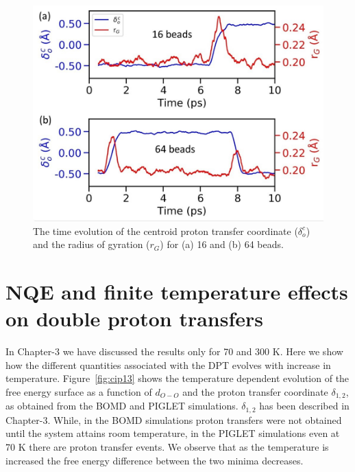 \begin{figure}
    \centering
    \includegraphics[width=15cm ]{./Appendix4/new_figures_si/figure10.jpg}
    \caption{The time evolution of the centroid proton transfer coordinate ($\delta_{o}^{c}$) and the radius of gyration ($r_G$) for (a) 16 and (b) 64 beads.}
    \label{fig:cip10}
\end{figure}

\section{NQE and finite temperature effects on double proton transfers}

In Chapter-3 we have discussed the results only for 70 and 300 K. Here we show how the different
quantities associated with the DPT evolves with increase in temperature. Figure~\ref{fig:cip13} shows 
the temperature dependent evolution of the free energy surface as a function of $d_{O-O}$ and
the proton transfer coordinate $\delta_{1,2}$, as obtained from the BOMD and PIGLET simulations. $\delta_{1,2}$
has been described in Chapter-3. While, in the BOMD simulations proton 
transfers were not obtained until the system attains room temperature,
in the PIGLET
simulations even at 70 K there are proton transfer events. We observe that as the temperature is increased the free energy difference between the
two minima decreases. 


